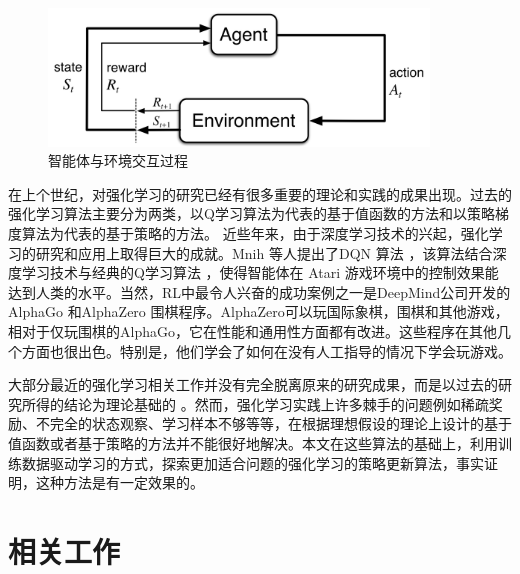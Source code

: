 \begin{figure}[h]
	\centering
	\includegraphics[width=0.9\textwidth]{image/chap01/interaction.png}
	\caption{智能体与环境交互过程\cite{suttonReinforcementLearningIntroduction2018}}
 	\label{fig:agent-env-interaction}
\end{figure}

在上个世纪，对强化学习的研究已经有很多重要的理论和实践的成果出现\cite{suttonReinforcementLearningIntroduction2018}。过去的强化学习算法主要分为两类，以Q学习\cite{watkinsQlearning1992}算法为代表的基于值函数的方法和以策略梯度\cite{mnihAsynchronousMethodsDeep2016}算法为代表的基于策略的方法。
近些年来，由于深度学习技术的兴起，强化学习的研究和应用上取得巨大的成就。Mnih 等人提出了DQN 算法\cite{mnihPlayingAtariDeep2013} \cite{mnihHumanlevelControlDeep2015}，该算法结合深度学习技术与经典的Q学习算法 \cite{watkinsQlearning1992}，使得智能体在 Atari 游戏环境中的控制效果能达到人类的水平。当然，RL中最令人兴奋的成功案例之一是DeepMind公司开发的AlphaGo \cite{silverMasteringGameGo2016} 和AlphaZero \cite{silverMasteringGameGo2017} 围棋程序。AlphaZero可以玩国际象棋，围棋和其他游戏，相对于仅玩围棋的AlphaGo，它在性能和通用性方面都有改进。这些程序在其他几个方面也很出色。特别是，他们学会了如何在没有人工指导的情况下学会玩游戏。

大部分最近的强化学习相关工作并没有完全脱离原来的研究成果，而是以过去的研究所得的结论为理论基础的 \cite{ohDiscoveringReinforcementLearning2020}。然而，强化学习实践上许多棘手的问题例如稀疏奖励、不完全的状态观察、学习样本不够等等，在根据理想假设的理论上设计的基于值函数或者基于策略的方法并不能很好地解决。本文在这些算法的基础上，利用训练数据驱动学习的方式，探索更加适合问题的强化学习的策略更新算法，事实证明，这种方法是有一定效果的。

\section{相关工作}
\label{sec:related-work}

